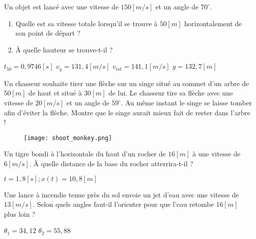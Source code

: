 \begin{exercise}
    Un objet est lancé avec une vitesse de \(150\unit{[m/s]}\) et un angle de \(70^{\circ}\).
    \begin{enumerate}[label=\alph*)]
        \item Quelle est sa vitesse totale lorsqu'il se trouve à \(50[m]\) horizontalement de son point de départ ?
        \item À quelle hauteur se trouve-t-il ?
    \end{enumerate}
\end{exercise}
\begin{solution}
    \(t_{50}=0,9746[s]\)
    \(v_y=131,4\unit{[m/s]}\)
    \(v_{tot}=141,1\unit{[m/s]}\)
    \(y=132,7[m]\)
\end{solution}


\begin{exercise}
    Un chasseur souhaite tirer une flèche sur un singe situé au sommet d'un arbre de \(50[m]\) de haut et situé à \(30[m]\) de lui. Le chasseur tire sa flèche avec une vitesse de \(20\unit{[m/s]}\) et un angle de \(59^{\circ}\). Au même instant le singe se laisse tomber afin d'éviter la flèche. Montre que le singe aurait mieux fait de rester dans l'arbre !
    \begin{figure}[h!]
        \centering
        \texttt{[image: shoot\_monkey.png]}
    \end{figure}
\end{exercise}


\begin{exercise}
    Un tigre bondi à l'horizontale du haut d'un rocher de \(16[m]\) à une vitesse de \(6\unit{[m/s]}\). À quelle distance de la base du rocher atterrira-t-il ?
\end{exercise}
\begin{solution}
    \(t=1,8[s] ; x(t)=10,8[m]\)
\end{solution}

\begin{exercise}
    Une lance à incendie tenue près du sol envoie un jet d'eau avec une vitesse de \(13\unit{[m/s]}\). Selon quels angles faut-il l'orienter pour que l'eau retombe \(16[m]\) plus loin ?
\end{exercise}
\begin{solution}
    \(\theta _1 = 34,12 \)
    \(\theta _2 = 55,88 \)
\end{solution}

\begin{exercise}
\end{exercise}

